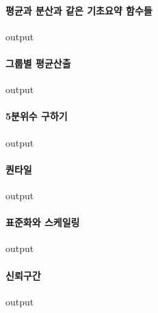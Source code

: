 \paragraph{평균과 분산과 같은 기초요약 함수들}
\begin{Schunk}
\begin{Soutput}
output
\end{Soutput}
\end{Schunk}

\paragraph{그룹별 평균산출}
\begin{Schunk}
\begin{Soutput}
output
\end{Soutput}
\end{Schunk}

\paragraph{5분위수 구하기}
\begin{Schunk}
\begin{Soutput}
output
\end{Soutput}
\end{Schunk}

\paragraph{퀀타일}
\begin{Schunk}
\begin{Soutput}
output
\end{Soutput}
\end{Schunk}

\paragraph{표준화와 스케일링}
\begin{Schunk}
\begin{Soutput}
output
\end{Soutput}
\end{Schunk}

\paragraph{신뢰구간}
\begin{Schunk}
\begin{Soutput}
output
\end{Soutput}
\end{Schunk}

